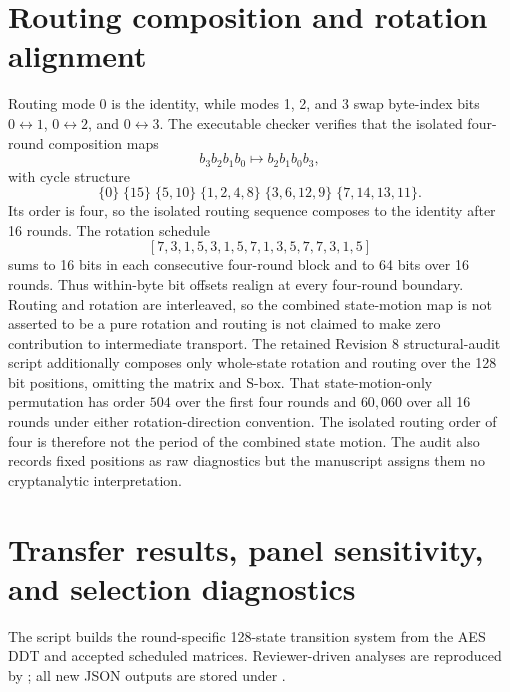 \documentclass[cryptography,supfile,submit,oneauthor]{Definitions/mdpi}
\begin{document}
\section{Routing composition and rotation alignment}
Routing mode 0 is the identity, while modes 1, 2, and 3 swap byte-index bits $0\leftrightarrow1$, $0\leftrightarrow2$, and $0\leftrightarrow3$. The executable checker  verifies that the isolated four-round composition maps
\[
b_3b_2b_1b_0\longmapsto b_2b_1b_0b_3,
\]
with cycle structure
\[
\{0\}\;\{15\}\;\{5,10\}\;\{1,2,4,8\}\;\{3,6,12,9\}\;\{7,14,13,11\}.
\]
Its order is four, so the isolated routing sequence composes to the identity after 16 rounds. The rotation schedule
\[
[7,3,1,5,3,1,5,7,1,3,5,7,7,3,1,5]
\]
sums to 16 bits in each consecutive four-round block and to 64 bits over 16 rounds. Thus within-byte bit offsets realign at every four-round boundary. Routing and rotation are interleaved, so the combined state-motion map is not asserted to be a pure rotation and routing is not claimed to make zero contribution to intermediate transport. The retained Revision 8 structural-audit script additionally composes only whole-state rotation and routing over the 128 bit positions, omitting the matrix and S-box. That state-motion-only permutation has order $504$ over the first four rounds and $60{,}060$ over all 16 rounds under either rotation-direction convention. The isolated routing order of four is therefore not the period of the combined state motion. The audit also records fixed positions as raw diagnostics but the manuscript assigns them no cryptanalytic interpretation.

\section{Transfer results, panel sensitivity, and selection diagnostics}
The script  builds the round-specific 128-state transition system from the AES DDT and accepted scheduled matrices. Reviewer-driven analyses are reproduced by ; all new JSON outputs are stored under .
\end{document}
